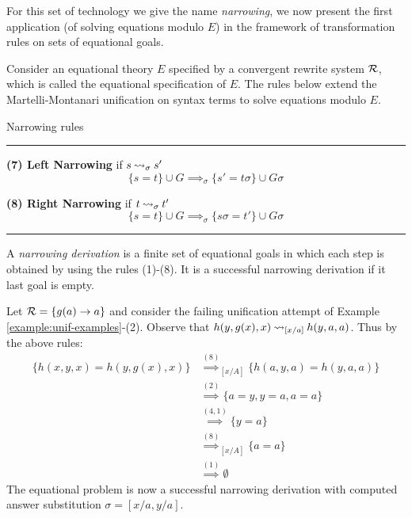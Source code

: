For this set of technology we give the name \textit{narrowing}, we now present the first application (of solving equations modulo $E$) in the framework of transformation rules on sets of equational goals.

Consider an equational theory $E$ specified by a convergent rewrite system $\mathcal{R}$, which is called the equational specification of $E$. The rules below extend the Martelli-Montanari unification on syntax terms to solve equations modulo $E$. \newpage
\begin{table}[ht]
	\caption{Narrowing rules}
	\label{table:narrowing_inf_rules}
	{\small
		\hrule
		\vspace{10pt}

		\textbf{(7) Left Narrowing} if $s \mathbin{\rightsquigarrow}_{\sigma} s'$
		$$\{ s = t \} \cup G \implies_{\sigma} \{ s' = t\sigma \} \cup G\sigma $$

		\textbf{(8) Right Narrowing} if $t \mathbin{\rightsquigarrow}_{\sigma} t'$
		$$\{ s = t \} \cup G \implies_{\sigma} \{ s\sigma = t' \} \cup G\sigma $$
		\hrule
	}
\end{table}

\begin{definition}
    A \textit{narrowing derivation} is a finite set of equational goals in which each step is obtained by using the rules (1)-(8). It is a successful narrowing derivation if it last goal is empty.
\end{definition}

\begin{example}
	Let $\mathcal{R} = \{ g(a) \rightarrow a \}$ and consider the failing unification attempt of Example \ref{example:unif-examples}-(2). Observe that $h(y,g(x),x) \mathbin{\rightsquigarrow}_{[x / a]} h(y,a,a)$. Thus by the above rules:
	\begin{align*}
		\{ h(x,y,x) = h(y,g(x),x) \} & \overset{(8)}{\implies}_{[x/A]} \{ h(a,y,a) = h(y,a,a) \} \\
		                             & \overset{(2)}{\implies} \{ a = y, y = a, a = a \}         \\
		                             & \overset{(4,1)}{\implies} \{ y = a\}                      \\
		                             & \overset{(8)}{\implies}_{[x/A]} \{  a = a \}              \\
		                             & \overset{(1)}{\implies} \emptyset
	\end{align*}
	The equational problem is now a successful narrowing derivation with computed answer substitution $\sigma = [x / a, y / a]$.
\end{example}

